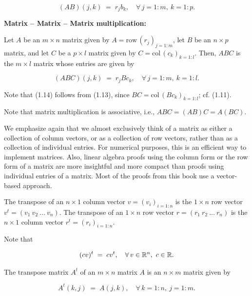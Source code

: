 \begin{equation}
(AB)(j,k) \;=\; r_j b_k, \quad \forall\, j=1:m,\ k=1:p.
\end{equation}

\medskip\noindent\textbf{Matrix -- Matrix -- Matrix multiplication:}\par
Let $A$ be an $m\times n$ matrix given by $A=\mathrm{row}\,(r_j)_{j=1:m}$,
let $B$ be an $n\times p$ matrix, and let $C$ be a $p\times l$ matrix given
by $C=\mathrm{col}\,(c_k)_{k=1:l}$. Then, $ABC$ is the $m\times l$ matrix
whose entries are given by

\begin{equation}
(ABC)(j,k) \;=\; r_j B c_k, \quad \forall\, j=1:m,\ k=1:l.
\end{equation}

Note that (1.14) follows from (1.13), since $BC=\mathrm{col}\,(Bc_k)_{k=1:l}$;
cf. (1.11).

Note that matrix multiplication is associative, i.e., $ABC=(AB)C=A(BC)$.

We emphasize again that we almost exclusively think of a matrix as either a
collection of column vectors, or as a collection of row vectors, rather
than as a collection of individual entries. For numerical purposes, this is
an efficient way to implement matrices. Also, linear algebra proofs using
the column form or the row form of a matrix are more insightful and more
compact than proofs using individual entries of a matrix. Most of the
proofs from this book use a vector-based approach.

\begin{definition}
The transpose of an $n\times 1$ column vector $v=(v_i)_{i=1:n}$ is the
$1\times n$ row vector $v^t=(v_1\ v_2\ \ldots\ v_n)$. The transpose of an
$1\times n$ row vector $r=(r_1\ r_2\ \ldots\ r_n)$ is the $n\times 1$ column
vector $r^t=(r_i)_{i=1:n}$.
\end{definition}

Note that

\begin{equation}
(cv)^t \;=\; cv^t, \quad \forall\, v\in\mathbb{R}^n,\ c\in\mathbb{R}.
\end{equation}

\begin{definition}
The transpose matrix $A^t$ of an $m\times n$ matrix $A$ is an $n\times m$
matrix given by
\end{definition}

\begin{equation}
A^t(k,j) \;=\; A(j,k), \quad \forall\, k=1:n,\ j=1:m.
\end{equation}

